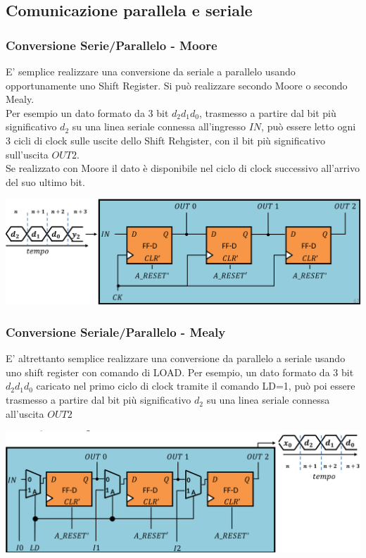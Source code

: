 \documentclass{article}
\begin{document}
\subsection{Comunicazione parallela e seriale}
\subsubsection{Conversione Serie/Parallelo - Moore}
E’ semplice realizzare una conversione da seriale a parallelo usando opportunamente uno Shift Register. Si può realizzare secondo Moore o secondo Mealy. 
\vspace{0.1cm}\\
Per esempio un dato formato da 3 bit $d_2d_1d_0$, trasmesso a partire dal bit più significativo $d_2$ su una linea seriale connessa all'ingresso $IN$, può essere letto ogni 3 cicli di clock sulle uscite dello Shift Rehgister, con il bit più significativo sull'uscita $OUT 2$.\\
Se realizzato con Moore il dato è disponibile nel ciclo di clock successivo all'arrivo del suo ultimo bit.
\begin{center}
    \includegraphics[scale=0.35]{sp moore.png}
\end{center}
\subsubsection{Conversione Seriale/Parallelo - Mealy}
E’ altrettanto semplice realizzare una conversione da parallelo a seriale usando uno shift register con comando di LOAD. Per esempio, un dato formato da 3 bit $d_2d_1d_0$ caricato nel primo ciclo di clock tramite il comando LD=1, può poi essere trasmesso a partire dal bit più significativo $d_2$ su una linea seriale connessa all’uscita $OUT 2$
\begin{center}
    \includegraphics[scale=0.35]{ps load.png}
\end{center}
\end{document}
